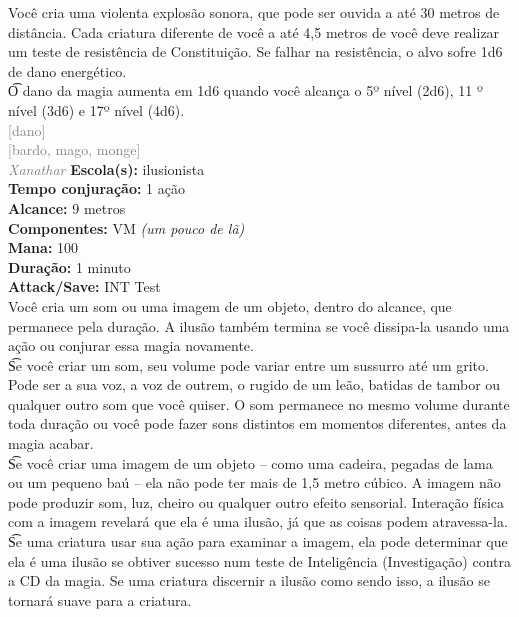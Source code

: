 \documentclass{RPG_Adventure}[2021/10/20]
\begin{document}
{\normalsize Você cria uma violenta explosão sonora, que pode ser ouvida a até 30 metros de distância. Cada criatura diferente de você a até 4,5 metros de você deve realizar um teste de resistência de Constituição. Se falhar na resistência, o alvo sofre 1d6 de dano energético.\\\t O dano da magia aumenta em 1d6 quando você alcança o 5º nível (2d6), 11 º nível (3d6) e 17º nível (4d6).\\}
{\scriptsize \textcolor{gray}{[dano]\\}}
{\scriptsize \textcolor{gray}{[bardo, mago, monge]\\}}
{\tiny \textcolor{gray}{\textit{Xanathar}}}
{\small \t \textbf{Escola(s):} ilusionista\\\t \textbf{Tempo conjuração:} 1 ação\\\t \textbf{Alcance:} 9 metros\\\t \textbf{Componentes:} VM \textit{(um pouco de lã)}\\\t \textbf{Mana:} 100\\\t \textbf{Duração:} 1 minuto\\\t \textbf{Attack/Save:} INT Test\\}
{\normalsize Você cria um som ou uma imagem de um objeto, dentro do alcance, que permanece pela duração. A ilusão também termina se você dissipa-la usando uma ação ou conjurar essa magia novamente.\\\t Se você criar um som, seu volume pode variar entre um sussurro até um grito. Pode ser a sua voz, a voz de outrem, o rugido de um leão, batidas de tambor ou qualquer outro som que você quiser. O som permanece no mesmo volume durante toda duração ou você pode fazer sons distintos em momentos diferentes, antes da magia acabar.\\\t Se você criar uma imagem de um objeto – como uma cadeira, pegadas de lama ou um pequeno baú – ela não pode ter mais de 1,5 metro cúbico. A imagem não pode produzir som, luz, cheiro ou qualquer outro efeito sensorial. Interação física com a imagem revelará que ela é uma ilusão, já que as coisas podem atravessa-la.\\\t Se uma criatura usar sua ação para examinar a imagem, ela pode determinar que ela é uma ilusão se obtiver sucesso num teste de Inteligência (Investigação) contra a CD da magia. Se uma criatura discernir a ilusão como sendo isso, a ilusão se tornará suave para a criatura.\\}
\end{document}
